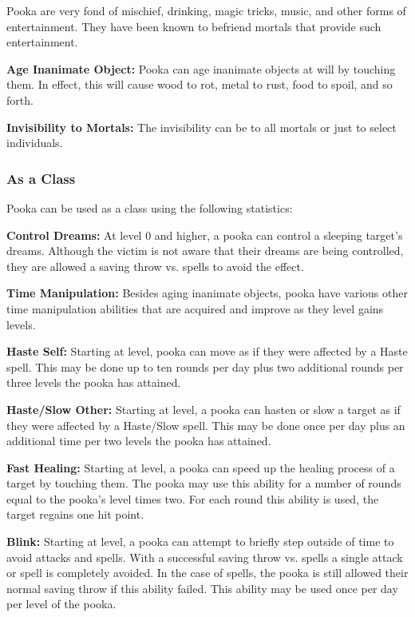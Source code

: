 \begin{multicols*}{2}
Pooka are very fond of mischief, drinking, magic tricks, music, and other forms of entertainment. They have been known to befriend mortals that provide such entertainment.

\textbf{Age Inanimate Object:} Pooka can age inanimate objects at will by touching them. In effect, this will cause wood to rot, metal to rust, food to spoil, and so forth.

\textbf{Invisibility to Mortals:} The invisibility can be to all mortals or just to select individuals.

\subsubsection{As a Class}
Pooka can be used as a class using the following statistics:

\textbf{Control Dreams:} At level 0 and higher, a pooka can control a sleeping target's dreams. Although the victim is not aware that their dreams are being controlled, they are allowed a saving throw vs. spells to avoid the effect.

\textbf{Time Manipulation:} Besides aging inanimate objects, pooka have various other time manipulation abilities that are acquired and improve as they level gains levels.

\textbf{Haste Self:} Starting at  level, pooka can move as if they were affected by a Haste spell. This may be done up to ten rounds per day plus two additional rounds per three levels the pooka has attained.

\textbf{Haste/Slow Other:} Starting at  level, a pooka can hasten or slow a target as if they were affected by a Haste/Slow spell. This may be done once per day plus an additional time per two levels the pooka has attained.

\textbf{Fast Healing:} Starting at  level, a pooka can speed up the healing process of a target by touching them. The pooka may use this ability for a number of rounds equal to the pooka's level times two. For each round this ability is used, the target regains one hit point.

\textbf{Blink:} Starting at  level, a pooka can attempt to briefly step outside of time to avoid attacks and spells. With a successful saving throw vs. spells a single attack or spell is completely avoided. In the case of spells, the pooka is still allowed their normal saving throw if this ability failed. This ability may be used once per day per level of the pooka.


\end{multicols*}
